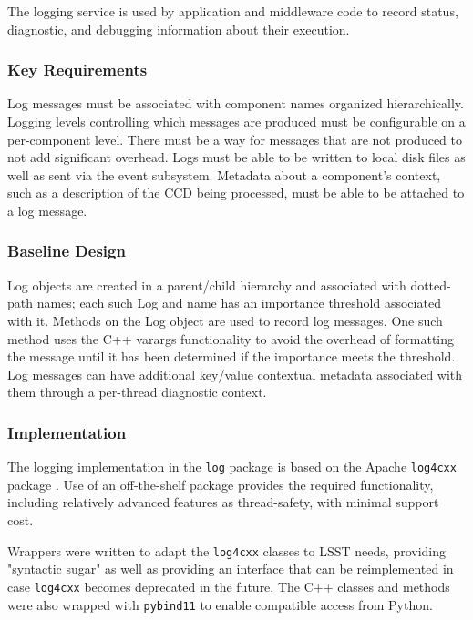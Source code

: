 \documentclass[DM,toc]{lsstdoc}
\begin{document}
The logging service is used by application and middleware code to record
status, diagnostic, and debugging information about their execution.

\subsubsection{Key Requirements}\label{logging-reqs}

Log messages must be associated with component names organized
hierarchically. Logging levels controlling which messages are produced
must be configurable on a per-component level. There must be a way for
messages that are not produced to not add significant overhead.
Logs must be able to
be written to local disk files as well as sent via the event subsystem.
Metadata about a component's context, such as a description of the CCD
being processed, must be able to be attached to a log message.

\subsubsection{Baseline Design}\label{logging-design}

Log objects are created in a parent/child hierarchy and associated with
dotted-path names; each such Log and name has an importance threshold
associated with it. Methods on the Log object are used to record log messages.
One such method uses the C++ varargs functionality to avoid the overhead of
formatting the message until it has been determined if the importance meets the
threshold. Log messages can have additional key/value contextual metadata
associated with them through a per-thread diagnostic context.

\subsubsection{Implementation}\label{logging-implementation}

The logging implementation in the \texttt{log} package is based on the Apache
\texttt{log4cxx} package \citep{log4cxx}.
Use of an off-the-shelf package provides the required functionality, including
relatively advanced features as thread-safety, with minimal support cost.

Wrappers were written to adapt the \texttt{log4cxx} classes to LSST needs,
providing "syntactic sugar" as well as providing an interface that can be
reimplemented in case \texttt{log4cxx} becomes deprecated in the future.  The
C++ classes and methods were also wrapped with \texttt{pybind11} to enable
compatible access from Python.
\end{document}
